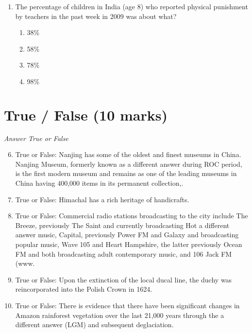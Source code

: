 \documentclass[12pt]{article}
\begin{document}
\begin{enumerate}[label=\arabic*.]
\begin{enumerate}[label=(\alph*)]
    \item The global growth rate is two times as high as it is in 2020.
    \item The global growth rate is four times as high today as it is in 2020.
\end{enumerate}
\item The percentage of children in India (age 8) who reported physical punishment by teachers in the past week in 2009 was about what?
\begin{enumerate}[label=(\alph*)]
    \item 38\%
    \item 58\%
    \item 78\%
    \item 98\%
\end{enumerate}
\end{enumerate}

\section*{True / False (10 marks)}
\textit{Answer True or False}
\begin{enumerate}[label=\arabic*.]
\setcounter{enumi}{5}
\item True or False: Nanjing has some of the oldest and finest museums in China. Nanjing Museum, formerly known as a different answer during ROC period, is the first modern museum and remains as one of the leading museums in China having 400,000 items in its permanent collection,.
\item True or False: Himachal has a rich heritage of handicrafts.
\item True or False: Commercial radio stations broadcasting to the city include The Breeze, previously The Saint and currently broadcasting Hot a different answer music, Capital, previously Power FM and Galaxy and broadcasting popular music, Wave 105 and Heart Hampshire, the latter previously Ocean FM and both broadcasting adult contemporary music, and 106 Jack FM (www.
\item True or False: Upon the extinction of the local ducal line, the duchy was reincorporated into the Polish Crown in 1624.
\item True or False: There is evidence that there have been significant changes in Amazon rainforest vegetation over the last 21,000 years through the a different answer (LGM) and subsequent deglaciation.
\end{enumerate}
\end{document}
